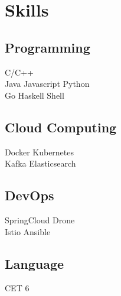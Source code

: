 \documentclass[]{deedy-resume-openfont}
\begin{document}
\begin{minipage}[t]{0.3\textwidth}

\section{Skills}
\sectionsep
\subsection{Programming}
C/C++ \\
Java \textbullet{} Javascript \textbullet{} Python\ \\
Go \textbullet{} Haskell \textbullet{} Shell \\ 
\sectionsep

\subsection{Cloud Computing}
Docker \textbullet{} Kubernetes \\
Kafka \textbullet{} Elasticsearch \\
\sectionsep

\subsection{DevOps}
SpringCloud \textbullet Drone \\
Istio \textbullet Ansible \\
\sectionsep

\subsection{Language}
CET 6   \\
\sectionsep

%
%

\end{minipage} 
\hfill
\end{document}
